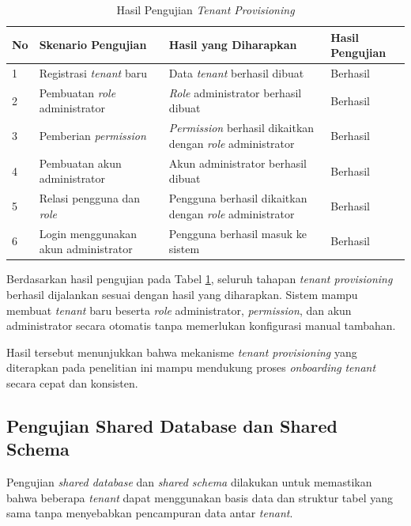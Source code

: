 \begin{table}[H]
  \centering
  \caption{Hasil Pengujian \textit{Tenant Provisioning}}
  \label{tab:hasil_pengujian_tenant_provisioning}
  \footnotesize
  \begin{tabular}{|l|>{\raggedright\arraybackslash}p{4.5cm}|>{\raggedright\arraybackslash}p{4.5cm}|>{\raggedright\arraybackslash}p{2.5cm}|}
    \hline
    \rowcolor[HTML]{EFEFEF}
    \textbf{No} & \textbf{Skenario Pengujian} & \textbf{Hasil yang Diharapkan} & \textbf{Hasil Pengujian} \\
    \hline
    1 & Registrasi \textit{tenant} baru & Data \textit{tenant} berhasil dibuat & Berhasil \\
    \hline
    2 & Pembuatan \textit{role} administrator & \textit{Role} administrator berhasil dibuat & Berhasil \\
    \hline
    3 & Pemberian \textit{permission} & \textit{Permission} berhasil dikaitkan dengan \textit{role} administrator & Berhasil \\
    \hline
    4 & Pembuatan akun administrator & Akun administrator berhasil dibuat & Berhasil \\
    \hline
    5 & Relasi pengguna dan \textit{role} & Pengguna berhasil dikaitkan dengan \textit{role} administrator & Berhasil \\
    \hline
    6 & Login menggunakan akun administrator & Pengguna berhasil masuk ke sistem & Berhasil \\
    \hline
  \end{tabular}
\end{table}

Berdasarkan hasil pengujian pada Tabel \ref{tab:hasil_pengujian_tenant_provisioning}, seluruh tahapan \textit{tenant provisioning} berhasil dijalankan sesuai dengan hasil yang diharapkan. Sistem mampu membuat \textit{tenant} baru beserta \textit{role} administrator, \textit{permission}, dan akun administrator secara otomatis tanpa memerlukan konfigurasi manual tambahan.

Hasil tersebut menunjukkan bahwa mekanisme \textit{tenant provisioning} yang diterapkan pada penelitian ini mampu mendukung proses \textit{onboarding} \textit{tenant} secara cepat dan konsisten.

\subsection{Pengujian Shared Database dan Shared Schema}

Pengujian \textit{shared database} dan \textit{shared schema} dilakukan untuk memastikan bahwa beberapa \textit{tenant} dapat menggunakan basis data dan struktur tabel yang sama tanpa menyebabkan pencampuran data antar \textit{tenant}.

